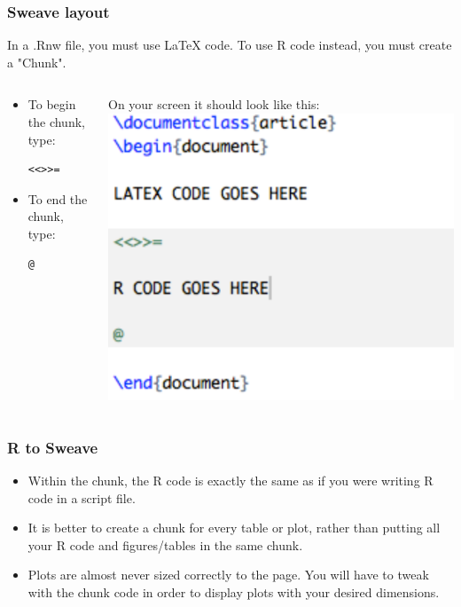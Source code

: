 \documentclass[nogin]{beamer}\usepackage[]{graphicx}\usepackage[]{color}
\begin{document}
\begin{frame}[fragile]
\frametitle{Sweave layout}
\begin{block}{}
In a .Rnw file, you must use LaTeX code. To use R code instead, you must create a "Chunk".
\end{block}
\begin{columns}[T]
\begin{column}{.5\textwidth}
\begin{itemize}
\item To begin the chunk, type:
\begin{verbatim}<<>>=\end{verbatim}
\item To end the chunk, type:
\begin{verbatim}@\end{verbatim}
\end{itemize}
\end{column}
\begin{column}{.5\textwidth}
On your screen it should look like this:
\includegraphics[width=\textwidth]{GuidePic1.pdf}
\end{column}\end{columns}
\end{frame}

\begin{frame}[fragile]
\frametitle{R to Sweave}
\begin{itemize}
\item Within the chunk, the R code is exactly the same as if you were writing R code in a script file.
\item It is better to create a chunk for every table or plot, rather than putting all your R code and figures/tables in the same chunk.
\item Plots are almost never sized correctly to the page. You will have to tweak with the chunk code in order to display plots with your desired dimensions.
\end{itemize}
\end{frame}
\end{document}
